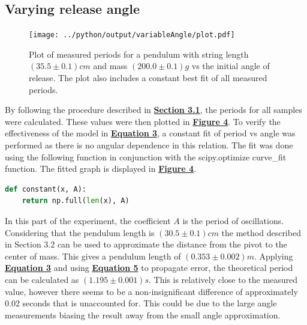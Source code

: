 \documentclass[
	letterpaper
	12pt
]{template}
\newcommand{\bref}[2]{\textbf{\hyperref[#1]{#2}}}
\begin{document}
\subsection{Varying release angle}
\begin{figure}\label{plt::angle}
	\centering
	\vspace{-20pt}
	\texttt{[image: ../python/output/variableAngle/plot.pdf]}
	\caption{Plot of measured periods for a pendulum with string length $(35.5\pm 0.1)\unit{cm}$ and mass $(200.0\pm 0.1)\unit{g}$ vs the initial angle of release. The plot also includes a constant best fit of all measured periods.}
\end{figure}
By following the procedure described in \bref{uncertainty}{Section 3.1}, the periods for all samples were calculated. These values were then plotted in \bref{plt::angle}{Figure 4}. To verify the effectiveness of the model in \bref{eqn::omegaValue}{Equation 3}, a constant fit of period vs angle was performed as there is no angular dependence in this relation. The fit was done using the following function in conjunction with the scipy.optimize curve\_fit function. The fitted graph is displayed in \bref{plt::angle}{Figure 4}.
\begin{lstlisting}[label={func::const}, captionpos=b,language=python]
def constant(x, A):
    return np.full(len(x), A)
\end{lstlisting}
In this part of the experiment, the coefficient $A$ is the period of oscillations. Considering that the pendulum length is $(30.5\pm 0.1)\unit{cm}$ the method described in Section 3.2 can be used to approximate the distance from the pivot to the center of mass. This gives a pendulum length of $(0.353\pm0.002)\unit{m}$. Applying \bref{eqn::omegaValue}{Equation 3} and using \bref{eqn::genUncert}{Equation 5} to propagate error, the theoretical period can be calculated as $(1.195\pm 0.001)\unit{s}$. This is relatively close to the measured value, however there seems to be a non-insignificant difference of approximately 0.02 seconds that is unaccounted for. This could be due to the large angle measurements biasing the result away from the small angle approximation.
\end{document}
